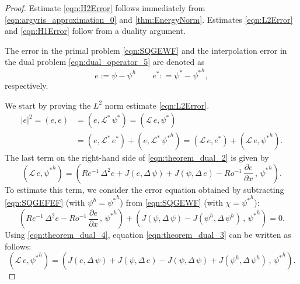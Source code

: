 \begin{proof}
  Estimate \eqref{eqn:H2Error} follows immediately from
  \eqref{eqn:argyris_approximation_0} and \autoref{thm:EnergyNorm}.
  Estimates \eqref{eqn:L2Error} and \eqref{eqn:H1Error} follow from a duality
  argument.

  The error in the primal problem \eqref{eqn:SQGEWF} and the interpolation error
  in the dual problem  \eqref{eqn:dual_operator_5} are denoted as
  \begin{equation}
    e := \psi - \psi^h \qquad e^* : = \psi^* - {\psi^*}^h ,
    \label{eqn:theorem_dual_1}
  \end{equation}
  respectively.

  We start by proving the $L^2$ norm estimate \eqref{eqn:L2Error}.
  \begin{align}
    |e|^2 = (e, e) &= (e , \mathcal{L}^* \, \psi^*)
      = (\mathcal{L} \, e , \psi^*) \nonumber \\
    &= (e , \mathcal{L}^* \, e^*) + (e , \mathcal{L}^* \, {\psi^*}^h)
      = (\mathcal{L} \, e , e^*) + (\mathcal{L} \, e , {\psi^*}^h) .
    \label{eqn:theorem_dual_2}
  \end{align}
  The last term on the right-hand side of \eqref{eqn:theorem_dual_2} is given by
  \begin{equation}
    (\mathcal{L} \, e , {\psi^*}^h) = \left( Re^{-1} \, \Delta^2 e
      + J(e , \Delta \, \psi) + J(\psi , \Delta \, e)
      - Ro^{-1} \, \frac{\partial e}{\partial x} \, , \, {\psi^*}^h \right) .
    \label{eqn:theorem_dual_3}
  \end{equation}
  To estimate this term, we consider the error equation obtained by subtracting
  \eqref{eqn:SQGEFEF} (with $\psi^h= {\psi^*}^h$) from \eqref{eqn:SQGEWF} (with
  $\chi = {\psi^*}^h$):
  \begin{equation}
    \left( Re^{-1} \, \Delta^2 e - Ro^{-1} \, \frac{\partial e}{\partial x} \, ,
      \, {\psi^*}^h \right) + \left( J(\psi , \Delta \, \psi)
      - J(\psi^h , \Delta \, \psi^h) \, , \, {\psi^*}^h \right) = 0 .
    \label{eqn:theorem_dual_4}
  \end{equation}
  Using \eqref{eqn:theorem_dual_4}, equation \eqref{eqn:theorem_dual_3} can be
  written as follows:
  \begin{equation}
    (\mathcal{L} \, e , {\psi^*}^h) = \left( J(e , \Delta \, \psi)
      + J(\psi , \Delta \, e) - J(\psi , \Delta \, \psi)
      + J(\psi^h , \Delta \, \psi^h) \, , \, {\psi^*}^h \right) .
    \label{eqn:theorem_dual_5}
  \end{equation}

\end{proof}
